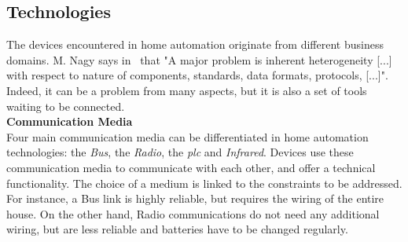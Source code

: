 \subsection{Technologies}

The devices encountered in home automation originate from different business domains. M. Nagy says in~\cite{Terziyan:2009} that "A major problem is inherent heterogeneity [...] with respect to nature of components, standards, data formats, protocols, [...]". Indeed, it can be a problem from many aspects, but it is also a set of tools waiting to be connected.\\

{\bf Communication Media}\\
Four main communication media can be differentiated in home automation technologies: the {\it Bus}, the {\it Radio}, the {\it \gls{plc}} and {\it Infrared}.
Devices use these communication media to communicate with each other, and offer a technical functionality.
The choice of a medium is linked to the constraints to be addressed. For instance, a Bus link is highly reliable, but requires the wiring of the entire house. On the other hand, Radio communications do not need any additional wiring, but are less reliable and batteries have to be changed regularly.\\

